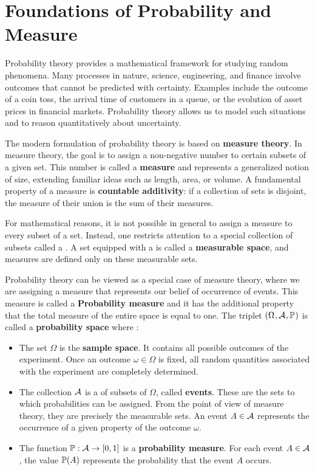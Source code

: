 \documentclass[../Main.tex]{subfiles}
\begin{document}
\chapter{Foundations of Probability and Measure}

Probability theory provides a mathematical framework for studying random phenomena. Many processes in nature, science, engineering, and finance involve outcomes that cannot be predicted with certainty. Examples include the outcome of a coin toss, the arrival time of customers in a queue, or the evolution of asset prices in financial markets. Probability theory allows us to model such situations and to reason quantitatively about uncertainty.

The modern formulation of probability theory is based on \textbf{measure theory}. In measure theory, the goal is to assign a non-negative number to certain subsets of a given set. This number is called a \textbf{measure} and represents a generalized notion of size, extending familiar ideas such as length, area, or volume. A fundamental property of a measure is \textbf{countable additivity}: if a collection of sets is disjoint, the measure of their union is the sum of their measures.

For mathematical reasons, it is not possible in general to assign a measure to every subset of a set. Instead, one restricts attention to a special collection of subsets called a \sfield. A set equipped with a \sfield is called a \textbf{measurable space}, and measures are defined only on these measurable sets.

Probability theory can be viewed as a special case of measure theory, where we are assigning a measure that represents our belief of occurrence of events. This measure is called a \textbf{Probability measure} and it has the additional property that the total measure of the entire space is equal to one. The triplet $(\Omega_{}, \mathcal{A}_{}, \mathbb{P}_{})$ is called a \textbf{probability space} where : 

\begin{itemize}
    \item The set $\Omega$ is the \textbf{sample space}. It contains all possible outcomes of the experiment. Once an outcome $\omega \in \Omega$ is fixed, all random quantities associated with the experiment are completely determined.
    \item The collection $\mathcal{A}$ is a \sfield of subsets of $\Omega$, called \textbf{events}. These are the sets to which probabilities can be assigned. From the point of view of measure theory, they are precisely the measurable sets. An event $A \in \mathcal{A}$ represents the occurrence of a given property of the outcome $\omega$.
    \item The function $\mathbb{P} : \mathcal{A} \to [0,1]$ is a \textbf{probability measure}. For each event $A \in \mathcal{A}$, the value $\mathbb{P}(A)$ represents the probability that the event $A$ occurs.
\end{itemize}
\end{document}

